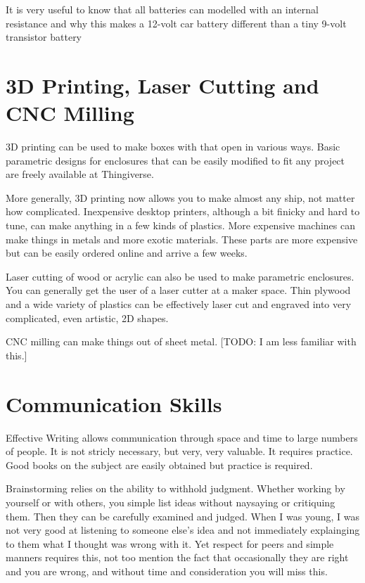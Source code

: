 \documentclass[
	fontsize=10pt, %
	twoside=false, %
	secnumdepth=1, %
]{kaobook}
\begin{document}
It is very useful to know that all batteries can modelled
with an internal resistance and why this makes a 12-volt car battery
different than a tiny 9-volt transistor battery

\section{3D Printing, Laser Cutting and CNC Milling}

3D printing can be used to make boxes with that open in various
ways. Basic parametric designs for enclosures that can be
easily modified to fit any project are freely available at
Thingiverse.

More generally, 3D printing now allows you to make almost
any ship, not matter how complicated. Inexpensive desktop
printers, although a bit finicky and hard to tune, can
make anything in a few kinds of plastics. More expensive
machines can make things in metals and more exotic materials.
These parts are more expensive but can be easily ordered
online and arrive a few weeks.

Laser cutting of wood or acrylic can also be used to make
parametric enclosures.
You can generally get the user of a laser cutter at a
maker space. Thin plywood and a wide variety of plastics
can be effectively laser cut and engraved into very complicated,
even artistic, 2D shapes.

CNC milling can make things out of sheet metal. [TODO:
  I am less familiar with this.]


\section{Communication Skills}

Effective Writing allows communication through space and time to
large numbers of people. It is not stricly necessary, but very, very
valuable. It requires practice.
Good books on the subject are easily obtained but practice is required.

Brainstorming relies on the ability to withhold judgment.
Whether working by yourself or with others, you simple list ideas
without naysaying or critiquing them.
Then they can be carefully examined and judged.
When I was young, I was not very good at listening to someone else's
idea and not immediately explainging to them what I thought was wrong with it.
Yet respect for peers and simple manners requires this, not too mention
the fact that occasionally they are right and you are wrong, and without
time and consideration you will miss this.
\end{document}
